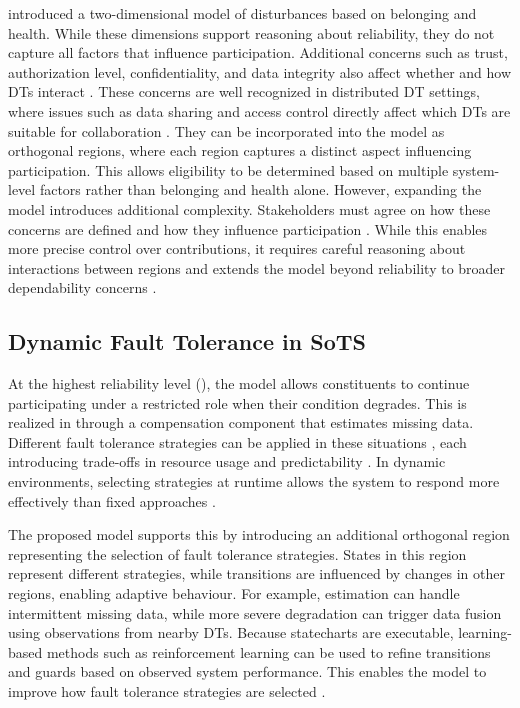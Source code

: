  introduced a two-dimensional model of disturbances based on belonging and health. While these dimensions support reasoning about reliability, they do not capture all factors that influence participation. Additional concerns such as trust, authorization level, confidentiality, and data integrity also affect whether and how DTs interact \cite{li2023trust, kuruppuarachchi2023trusted}. These concerns are well recognized in distributed DT settings, where issues such as data sharing and access control directly affect which DTs are suitable for collaboration \cite{tripathi2024stakeholders}. They can be incorporated into the model as orthogonal regions, where each region captures a distinct aspect influencing participation. This allows eligibility to be determined based on multiple system-level factors rather than belonging and health alone. However, expanding the model introduces additional complexity. Stakeholders must agree on how these concerns are defined and how they influence participation \cite{carney2005topics}. While this enables more precise control over contributions, it requires careful reasoning about interactions between regions and extends the model beyond reliability to broader dependability concerns \cite{avizienis2004basic}.

\subsection{Dynamic Fault Tolerance in SoTS}
At the highest reliability level (), the model allows constituents to continue participating under a restricted role when their condition degrades. This is realized in  through a compensation component that estimates missing data. Different fault tolerance strategies can be applied in these situations \cite{hanmer2013patterns}, each introducing trade-offs in resource usage and predictability \cite{narasimhan2002trade}. In dynamic environments, selecting strategies at runtime allows the system to respond more effectively than fixed approaches \cite{de2022systematic, ballesteros2022infrastructure}.

The proposed model supports this by introducing an additional orthogonal region representing the selection of fault tolerance strategies. States in this region represent different strategies, while transitions are influenced by changes in other regions, enabling adaptive behaviour. For example, estimation can handle intermittent missing data, while more severe degradation can trigger data fusion using observations from nearby DTs. Because statecharts are executable, learning-based methods such as reinforcement learning can be used to refine transitions and guards based on observed system performance. This enables the model to improve how fault tolerance strategies are selected \cite{zhang2020fault, dong2023deep}.


